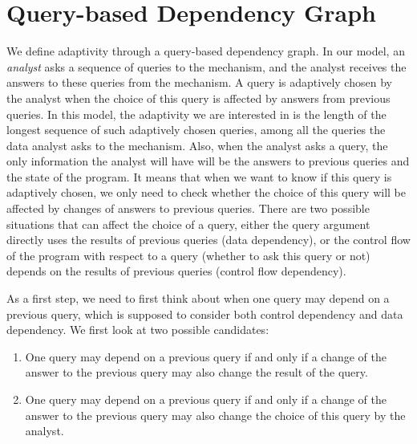 \section{ Query-based Dependency Graph}
\label{sec:adapt-query-graph}
%
We define adaptivity through a query-based dependency graph. In our model, an \emph{analyst} asks a sequence of queries to the mechanism, and the analyst receives the answers to these queries from the mechanism. A query is adaptively chosen by the analyst when the choice of this query is affected by answers from previous queries. In this model, the adaptivity we are interested in is the length of the longest sequence of such adaptively chosen queries, among all the queries the data analyst asks to the mechanism.  Also, when the analyst asks a query, the only information the analyst will have will be the answers to previous queries and the state of the program. It means that when we want to know if this query is adaptively chosen, we only need to check whether the choice of this query will be affected by changes of answers to previous queries. There are two possible situations that can  affect the choice of a query,  
either the query argument directly uses the results of previous queries (data dependency), or the control flow of the program with respect to a query (whether to ask this query or not) depends on the results of previous queries (control flow dependency).

As a first step, we need to first think about when one query may depend on a previous query, which is supposed to consider both control dependency and data dependency. We first look at two possible candidates:
\begin{enumerate}
    \item One query may depend on a previous query if and only if a change of the answer to the previous query may also change the result of the query.
    \item One query may depend on a previous query if and only if a change of the answer to the previous query may also change the choice of this query by the analyst.
\end{enumerate}

